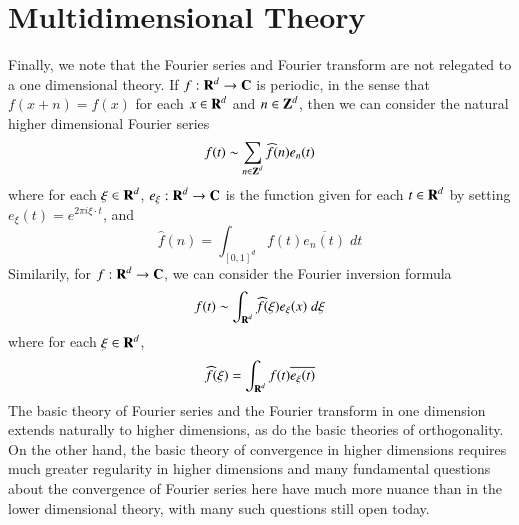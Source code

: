 \section{Multidimensional Theory}

Finally, we note that the Fourier series and Fourier transform are not relegated to a one dimensional theory. If $f: \operatorname{\mathbf{R}}^d \to \operatorname{\mathbf{C}}$ is periodic, in the sense that $f(x + n) = f(x)$ for each $x \in \operatorname{\mathbf{R}}^d$ and $n \in \operatorname{\mathbf{Z}}^d$, then we can consider the natural higher dimensional Fourier series
%
\[ f(t) \sim \sum_{n \in \operatorname{\mathbf{Z}}^d} \widehat{f}(n) e_n(t) \] 
%
where for each $\xi \in \operatorname{\mathbf{R}}^d$, $e_\xi: \operatorname{\mathbf{R}}^d \to \operatorname{\mathbf{C}}$ is the function given for each $t \in \operatorname{\mathbf{R}}^d$ by setting $e_\xi(t) = e^{2 \pi i \xi \cdot t}$, and
%
\[ \widehat{f}(n) = \int_{[0,1]^d} f(t) \overline{e_n(t)}\; dt \]
%
Similarily, for $f: \operatorname{\mathbf{R}}^d \to \operatorname{\mathbf{C}}$, we can consider the Fourier inversion formula
%
\[ f(t) \sim \int_{\operatorname{\mathbf{R}}^d} \widehat{f}(\xi) e_\xi(x)\; d\xi \]
%
where for each $\xi \in \operatorname{\mathbf{R}}^d$,
%
\[ \widehat{f}(\xi) = \int_{\operatorname{\mathbf{R}}^d} f(t) \overline{e_\xi(t)} \]
%
The basic theory of Fourier series and the Fourier transform in one dimension extends naturally to higher dimensions, as do the basic theories of orthogonality. On the other hand, the basic theory of convergence in higher dimensions requires much greater regularity in higher dimensions and many fundamental questions about the convergence of Fourier series here have much more nuance than in the lower dimensional theory, with many such questions still open today.

%


